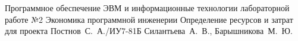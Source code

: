 \documentclass{bmstu}
\begin{document}
	
	{Программное обеспечение ЭВМ и информационные технологии}
	{лабораторной работе №2}
	{Экономика программной инженерии}
	{Определение ресурсов и затрат для проекта}
	{}
	{Постнов~С.~А./ИУ7-81Б}
	{Силантьева~А.~В., Барышникова~М.~Ю.}
	
	\maketableofcontents
	
	
	
\end{document}
